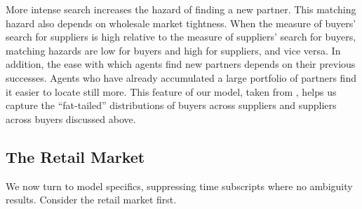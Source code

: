 \documentclass[12pt]{article} \usepackage{amsmath,amssymb,amsthm,geometry,graphicx,setspace,algorithm,algpseudocode,float}
\newcommand{\quotes}[1]{``#1''}
\begin{document}
\par
More intense search increases the hazard of finding a new partner. This matching hazard also depends on wholesale market tightness. When the measure of buyers' search for suppliers is high relative to the measure of suppliers' search for buyers, matching hazards are low for buyers and high for suppliers, and vice versa. In addition, the ease with which agents find new partners depends on their previous successes. Agents who have already accumulated a large portfolio of partners find it easier to locate still more. This feature of our model, taken from \citet{eaton2014a}, helps us capture the \quotes{fat-tailed} distributions of buyers across suppliers and suppliers across buyers discussed above.

 \subsection{The Retail Market}
\label{sec:retail_mkt}
We now turn to model specifics, suppressing time subscripts where no ambiguity results. Consider the retail market first.
\par
\end{document}
